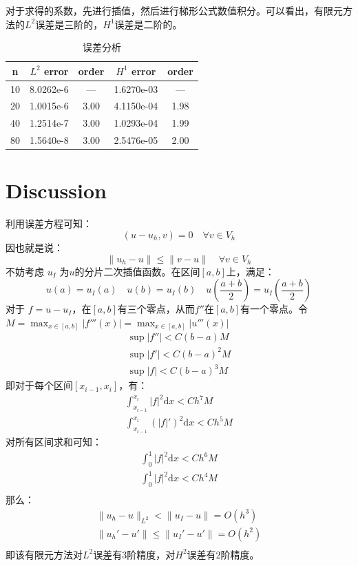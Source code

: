 \documentclass{ctexart}
\begin{document}
对于求得的系数，先进行插值，然后进行梯形公式数值积分。可以看出，有限元方法的$L^2$误差是三阶的，$H^1$误差是二阶的。
\begin{table}[H]
  \caption{\label{table.label} 误差分析} \centering
  \bigskip
  \begin{small}
  \begin{tabular}{|c|cc|cc|}
    \hline
    n &$L^2 $ error & order &$ H^1$ error & order\\\hline
    10 & 8.0262e-6 & ---  & 1.6270e-03 & --- \\
    20 & 1.0015e-6 & 3.00 & 4.1150e-04 & 1.98\\
    40 & 1.2514e-7 & 3.00 & 1.0293e-04 & 1.99 \\
    80 & 1.5640e-8 & 3.00 & 2.5476e-05 & 2.00\\\hline
  \end{tabular}
  \end{small}
\end{table}

\section{Discussion}

利用误差方程可知：
\begin{equation}
  (u - u_h, v) = 0\quad \forall v \in V_h
\end{equation}
因也就是说：
\begin{equation}
  \| u_h - u \| \le \| v - u \| \quad\forall v \in V_h
\end{equation}
不妨考虑 $u_I$ 为$u$的分片二次插值函数。在区间$[a,b]$上，满足：
\begin{equation}
  u(a) = u_I(a)\quad u(b) = u_I(b) \quad u(\frac{a+b}{2}) = u_I(\frac{a+b}{2})
\end{equation}
对于 $f = u-u_I$，在$[a,b]$有三个零点，从而$f''$在$[a,b]$有一个零点。令 $M = \max_{x \in [a,b]} |f'''(x)| = \max_{x\in[a,b]} |u'''(x)|$
\begin{eqnarray}
  \sup | f'' | < C (b-a) M\\
  \sup | f' |  < C (b-a)^2 M\\
  \sup | f |   < C (b-a)^3 M
\end{eqnarray}
即对于每个区间$[x_{i-1}, x_{i}]$，有：
\begin{eqnarray}
  \int_{x_{i-1}}^{x_i} |f|^2 \mathrm dx < C h^7 M\\
  \int_{x_{i-1}}^{x_i} (|f|')^2 \mathrm dx < C h^5 M
\end{eqnarray}
对所有区间求和可知：
\begin{eqnarray}
  \int_{0}^{1} |f|^2 \mathrm dx < C h^6 M\\
  \int_{0}^{1} |f|^2 \mathrm dx < C h^4 M\\
\end{eqnarray}
那么：
\begin{eqnarray}
  \| u_h - u \|_{L^2} < \| u_I - u \| = O(h^3)\\
  \| u_h' - u' \| \le \| u_I' - u' \| = O(h^2)\\
\end{eqnarray}
即该有限元方法对$L^2$误差有3阶精度，对$H^2$误差有2阶精度。
\end{document}
